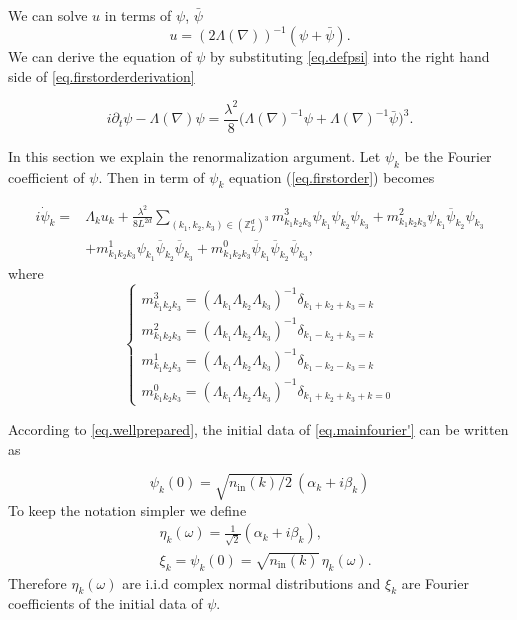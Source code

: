 We can solve $u$ in terms of $\psi$, $\bar{\psi}$
\begin{equation}\label{eq.defpsi}
    u=(2\Lambda(\nabla))^{-1}(\psi+\bar{\psi}).
\end{equation} 
We can derive the equation of $\psi$ by substituting \eqref{eq.defpsi} into the right hand side of \eqref{eq.firstorderderivation}

\begin{equation}\label{eq.firstorder}
    i\partial_t\psi-\Lambda(\nabla)\psi=\frac{\lambda^2}{8} \Big(\Lambda(\nabla)^{-1}\psi+\Lambda(\nabla)^{-1}\bar{\psi}\Big)^3.
\end{equation} 


In this section we explain the renormalization argument.
Let $\psi_k$ be the Fourier coefficient of $\psi$. Then in term of $\psi_k$ equation (\ref{eq.firstorder}) becomes

\begin{equation}\label{eq.mainfourier'}
\begin{split}
i \dot{\psi}_{k} =& \Lambda_k u_k+\frac{\lambda^2}{8L^{2d}} \sum_{(k_1,k_2,k_{3}) \in (\mathbb{Z}^d_L)^3} m^{3}_{k_1k_2k_3}\psi_{k_1}\psi_{k_2}  \psi_{k_3}
+m^{2}_{k_1k_2k_3}\psi_{k_1}\overline{\psi}_{k_2}  \psi_{k_3}
\\
&+m^{1}_{k_1k_2k_3}\psi_{k_1}\overline{\psi}_{k_2}  \overline{\psi}_{k_3}
+m^{0}_{k_1k_2k_3}\overline{\psi}_{k_1}\overline{\psi}_{k_2}  \overline{\psi}_{k_3},
\end{split}
\end{equation}
where 
\begin{equation}
\begin{cases}
m^{3}_{k_1k_2k_3}=(\Lambda_{k_1}\Lambda_{k_2}\Lambda_{k_3})^{-1} \delta_{k_1 + k_2 +k_3 = k}
\\
m^{2}_{k_1k_2k_3}=(\Lambda_{k_1}\Lambda_{k_2}\Lambda_{k_3})^{-1} \delta_{k_1 - k_2 +k_3 = k}
\\
m^{1}_{k_1k_2k_3}=(\Lambda_{k_1}\Lambda_{k_2}\Lambda_{k_3})^{-1} \delta_{k_1 - k_2 -k_3 = k}
\\
m^{0}_{k_1k_2k_3}=(\Lambda_{k_1}\Lambda_{k_2}\Lambda_{k_3})^{-1} \delta_{k_1 + k_2 +k_3 + k =0}
\end{cases}
\end{equation}

According to \eqref{eq.wellprepared}, the initial data of \eqref{eq.mainfourier'} can be written as 

\begin{equation}
    \psi_k(0) =  \sqrt{n_{\textrm{in}}(k)/2} \,(\alpha_k+i\beta_k)
\end{equation}
To keep the notation simpler we define
\begin{equation}
\begin{split}
    &\eta_{k}(\omega)=\frac{1}{\sqrt{2}}(\alpha_k+i\beta_k),
    \\
    &\xi_k = \psi_k(0) = \sqrt{n_{\textrm{in}}(k)} \, \eta_{k}(\omega).
\end{split}
\end{equation}
Therefore $\eta_{k}(\omega)$ are i.i.d complex normal distributions and $\xi_k$ are Fourier coefficients of the initial data of $\psi$.

